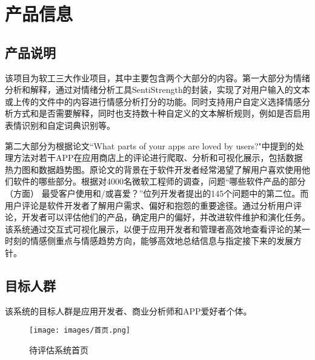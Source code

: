\section{产品信息}

\subsection{产品说明}
该项目为软工三大作业项目，其中主要包含两个大部分的内容。第一大部分为情绪分析和解释，通过对情绪分析工具SentiStrength的封装，实现了对用户输入的文本或上传的文件中的内容进行情感分析打分的功能。同时支持用户自定义选择情感分析方式和是否需要解释，同时也支持数十种自定义的文本解析规则，例如是否启用表情识别和自定词典识别等。

第二大部分为根据论文``What parts of your apps are loved by users?"中提到的处理方法对若干APP在应用商店上的评论进行爬取、分析和可视化展示，包括数据热力图和数据趋势图。原论文的背景在于软件开发者经常渴望了解用户喜欢使用他们软件的哪些部分。根据对4000名微软工程师的调查，问题“哪些软件产品的部分（方面） 最受客户使用和/或喜爱？”位列开发者提出的145个问题中的第二位。而用户评论是软件开发者了解用户需求、偏好和抱怨的重要途径。通过分析用户评论，开发者可以评估他们的产品，确定用户的偏好，并改进软件维护和演化任务。该系统通过交互式可视化展示，以便于应用开发者和管理者高效地查看评论的某一时刻的情感侧重点与情感趋势方向，能够高效地总结信息与指定接下来的发展方针。

\subsection{目标人群}
该系统的目标人群是应用开发者、商业分析师和APP爱好者个体。

\begin{figure}[htbp]
	\centering
	\texttt{[image: images/首页.png]}
	\caption{待评估系统首页}
\end{figure}
